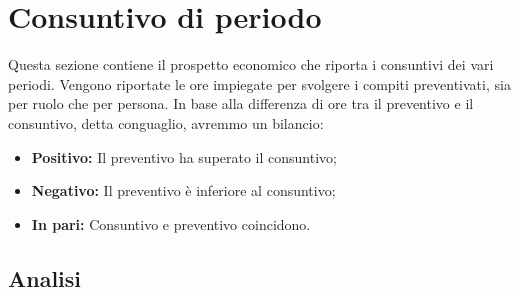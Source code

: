 \section{Consuntivo di periodo}
Questa sezione contiene il prospetto economico che riporta i consuntivi dei vari periodi. Vengono riportate le ore impiegate per svolgere i compiti preventivati, sia per ruolo che per persona. In base alla differenza di ore tra il preventivo e il consuntivo, detta conguaglio, avremmo un bilancio: \\
\begin{itemize}
	\item \textbf{Positivo:} Il preventivo ha superato il consuntivo;
	\item \textbf{Negativo:} Il preventivo è inferiore al consuntivo;
	\item \textbf{In pari:} Consuntivo e preventivo coincidono. \\
\end{itemize}
	\subsection{Analisi}
